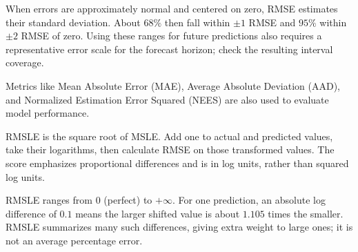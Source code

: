\noindent
{}

{When errors are approximately normal and centered on zero, RMSE estimates their standard deviation. About $68\%$ then fall within $\pm 1$ RMSE and $95\%$ within $\pm 2$ RMSE of zero. Using these ranges for future predictions also requires a representative error scale for the forecast horizon; check the resulting interval coverage.}


\metricsecondary
Metrics like Mean Absolute Error (MAE), Average Absolute Deviation (AAD), and Normalized Estimation Error Squared (NEES) are also used to evaluate model performance.

\metricend
\clearpage
\thispagestyle{regressionstyle}
\label{sec:rmsle}

RMSLE is the square root of MSLE. Add one to actual and predicted values, take their logarithms, then calculate RMSE on those transformed values. The score emphasizes proportional differences and is in log units, rather than squared log units.

\begin{metricformula}
\end{metricformula}

RMSLE ranges from $0$ (perfect) to $+\infty$. For one prediction, an absolute log difference of $0.1$ means the larger shifted value is about $1.105$ times the smaller. RMSLE summarizes many such differences, giving extra weight to large ones; it is not an average percentage error.

